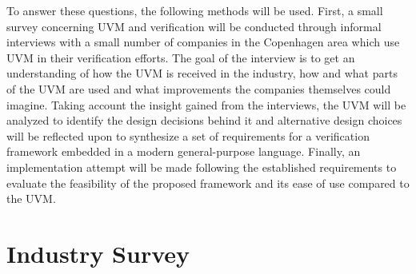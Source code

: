 To answer these questions, the following methods will be used. First, a small survey concerning UVM and verification
will be conducted through informal interviews with a small number of companies in the Copenhagen area which use UVM
in their verification efforts. The goal of the interview is to get an understanding of how the UVM is received in the
industry, how and what parts of the UVM are used and what improvements the companies themselves could imagine. Taking
account the insight gained from the interviews, the UVM will be analyzed to identify the design decisions behind it
and alternative design choices will be reflected upon to synthesize a set of requirements for a verification
framework embedded in a modern general-purpose language. Finally, an implementation attempt will be made following
the established requirements to evaluate the feasibility of the proposed framework and its ease of use compared to the UVM.

\chapter{Industry Survey} %

